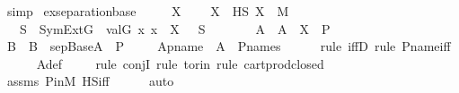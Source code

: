 \begin{isabellebody}
\ simp\isanewline
{}\isamarkupfalse%
%
\endisatagproof
{\isafoldproof}%
%
\isadelimproof
\isanewline
%
\endisadelimproof
\isanewline
{}\isamarkupfalse%
\ ex{\isacharunderscore}{\kern0pt}separation{\isacharunderscore}{\kern0pt}base\ {\isacharcolon}{\kern0pt}\ \isanewline
\ \ \ X\ \isanewline
\ \ \ {\isachardoublequoteopen}X\ {\isasymsubseteq}\ HS{\isachardoublequoteclose}\ {\isachardoublequoteopen}X\ {\isasymin}\ M{\isachardoublequoteclose}\ \isanewline
\ \ \ {\isachardoublequoteopen}{\isasymexists}S\ {\isasymin}\ SymExt{\isacharparenleft}{\kern0pt}G{\isacharparenright}{\kern0pt}{\isachardot}{\kern0pt}\ {\isacharbraceleft}{\kern0pt}\ val{\isacharparenleft}{\kern0pt}G{\isacharcomma}{\kern0pt}\ x{\isacharparenright}{\kern0pt}{\isachardot}{\kern0pt}\ x\ {\isasymin}\ X\ {\isacharbraceright}{\kern0pt}\ {\isasymsubseteq}\ S{\isachardoublequoteclose}\ \isanewline
%
\isadelimproof
%
\endisadelimproof
%
\isatagproof
{}\isamarkupfalse%
\ {\isacharminus}{\kern0pt}\ \isanewline
\ \ \isamarkupfalse%
\ A\ \ {\isachardoublequoteopen}A\ {\isasymequiv}\ X\ {\isasymtimes}\ P{\isachardoublequoteclose}\ \isanewline
\ \ \isamarkupfalse%
\ B\ \ {\isachardoublequoteopen}B\ {\isasymequiv}\ sep{\isacharunderscore}{\kern0pt}Base{\isacharparenleft}{\kern0pt}A{\isacharparenright}{\kern0pt}\ {\isasymtimes}\ P{\isachardoublequoteclose}\ \isanewline
\isanewline
\ \ \isamarkupfalse%
\ Apname\ {\isacharcolon}{\kern0pt}\ {\isachardoublequoteopen}A\ {\isasymin}\ P{\isacharunderscore}{\kern0pt}names{\isachardoublequoteclose}\ \isanewline
\ \ \ \ \isamarkupfalse%
{\isacharparenleft}{\kern0pt}rule\ iffD{}{\isacharcomma}{\kern0pt}\ rule\ P{\isacharunderscore}{\kern0pt}name{\isacharunderscore}{\kern0pt}iff{\isacharparenright}{\kern0pt}\isanewline
\ \ \ \ \isamarkupfalse%
\ A{\isacharunderscore}{\kern0pt}def\isanewline
\ \ \ \ \isamarkupfalse%
{\isacharparenleft}{\kern0pt}rule\ conjI{\isacharcomma}{\kern0pt}\ rule\ to{\isacharunderscore}{\kern0pt}rin{\isacharcomma}{\kern0pt}\ rule\ cartprod{\isacharunderscore}{\kern0pt}closed{\isacharparenright}{\kern0pt}\isanewline
\ \ \ \ \isamarkupfalse%
\ assms\ P{\isacharunderscore}{\kern0pt}in{\isacharunderscore}{\kern0pt}M\ HS{\isacharunderscore}{\kern0pt}iff\isanewline
\ \ \ \ \isamarkupfalse%
\ auto\isanewline
\isanewline
\ \ \isamarkupfalse%
\ \isamarkupfalse%

\end{isabellebody}
